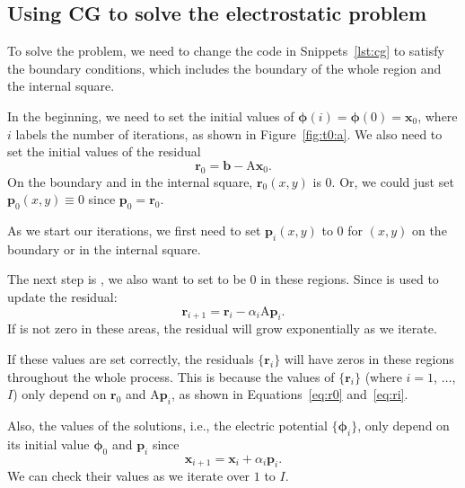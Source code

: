\subsection{Using CG to solve the electrostatic problem}

To solve the problem, we need to change the
code in Snippets~\ref{lst:cg} to satisfy the boundary conditions, which includes
the boundary of the whole region and the internal square.

In the beginning, we need to set the initial values of
\(\bm{\phi}(i) = \bm{\phi}(0) = \bm{x}_0\),
where \(i\) labels the number of iterations, as shown in Figure~\ref{fig:t0:a}.
We also need to set the initial values of the residual
%
\begin{equation}\label{eq:r0}
    \bm{r}_0 = \bm{b} - \mathrm{A} \bm{x}_0.
\end{equation}
%
On the boundary and in the internal square, \(\bm{r}_0(x, y)\) is \(0\).
Or, we could just set \(\bm{p}_0(x, y) \equiv 0\) since \(\bm{p}_0 = \bm{r}_0\).

As we start our iterations, we first need to set \(\bm{p}_i(x, y)\) to \(0\)
for \((x, y)\) on the boundary or in the internal square.

The next step is , we also want to set  to be \(0\)
in these regions. Since  is used to update the residual:
%
\begin{equation}\label{eq:ri}
    \bm{r}_{i+1} = \bm{r}_i - \alpha_i \mathrm{A} \bm{p}_i.
\end{equation}
%
If  is not zero in these areas, the residual will grow exponentially
as we iterate.

If these values are set correctly, the residuals \(\{\bm{r}_i\}\) will have
zeros in these regions throughout the whole process.
This is because the values of \(\{\bm{r}_i\}\) (where \(i = 1\), \(\ldots\), \(I\))
only depend on \(\bm{r}_0\) and \(\mathrm{A} \bm{p}_i\), as shown in
Equations~\eqref{eq:r0} and~\eqref{eq:ri}.

Also, the values of the solutions, i.e., the electric potential \(\{\bm{\phi}_i\}\),
only depend on its initial value \(\bm{\phi}_0\) and \(\bm{p}_i\) since
%
\begin{equation}
    \bm{x}_{i+1} = \bm{x}_i + \alpha_i \bm{p}_i.
\end{equation}
%
We can check their values as we iterate over \(1\) to \(I\).

